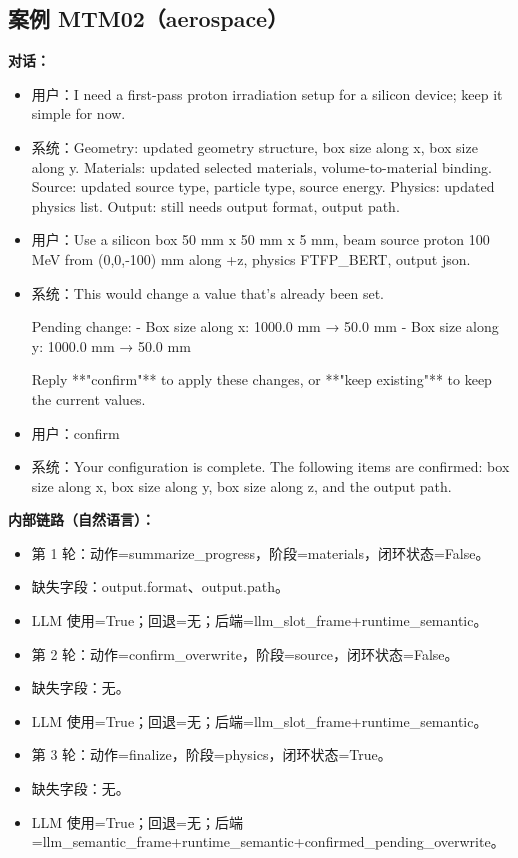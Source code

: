 \documentclass[11pt]{ctexart}
\begin{document}
\subsection{案例 MTM02（aerospace）}
\textbf{对话：}
\begin{itemize}
\item 用户：I need a first-pass proton irradiation setup for a silicon device; keep it simple for now.
\item 系统：Geometry: updated geometry structure, box size along x, box size along y. Materials: updated selected materials, volume-to-material binding. Source: updated source type, particle type, source energy. Physics: updated physics list. Output: still needs output format, output path.
\item 用户：Use a silicon box 50 mm x 50 mm x 5 mm, beam source proton 100 MeV from (0,0,-100) mm along +z, physics FTFP\_BERT, output json.
\item 系统：This would change a value that's already been set.

Pending change:
- Box size along x: 1000.0 mm → 50.0 mm
- Box size along y: 1000.0 mm → 50.0 mm

Reply **"confirm"** to apply these changes, or **"keep existing"** to keep the current values.
\item 用户：confirm
\item 系统：Your configuration is complete. The following items are confirmed: box size along x, box size along y, box size along z, and the output path.
\end{itemize}
\textbf{内部链路（自然语言）：}
\begin{itemize}
\item 第 1 轮：动作=summarize\_progress，阶段=materials，闭环状态=False。
\item 缺失字段：output.format、output.path。
\item LLM 使用=True；回退=无；后端=llm\_slot\_frame+runtime\_semantic。
\item 第 2 轮：动作=confirm\_overwrite，阶段=source，闭环状态=False。
\item 缺失字段：无。
\item LLM 使用=True；回退=无；后端=llm\_slot\_frame+runtime\_semantic。
\item 第 3 轮：动作=finalize，阶段=physics，闭环状态=True。
\item 缺失字段：无。
\item LLM 使用=True；回退=无；后端=llm\_semantic\_frame+runtime\_semantic+confirmed\_pending\_overwrite。
\end{itemize}
\end{document}
